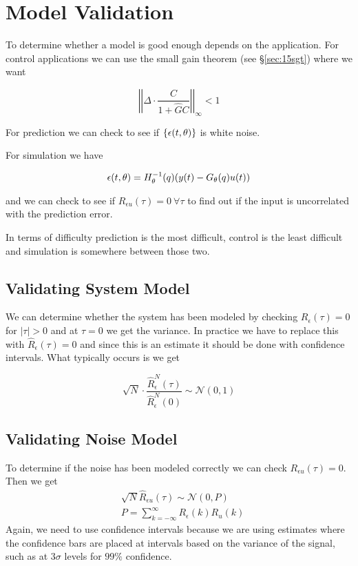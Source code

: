 \section{Model Validation}
To determine whether a model is good enough depends on the application.
For control applications we can use the small gain theorem (see \S\ref{sec:15sgt}) where we want

\begin{equation*}
\left|\left|\Delta\cdot\frac{C}{1+\hat{G}C}\right|\right|_\infty < 1
\end{equation*}

For prediction we can check to see if $\{\epsilon(t,\theta)\}$ is white noise.

For simulation we have

\begin{equation*}
\epsilon(t,\theta) = H_\theta^{-1}(q)(y(t)-G_\theta(q)u(t))
\end{equation*}

and we can check to see if $R_{\epsilon u}(\tau)=0~\forall \tau$ to find out if the input is uncorrelated with the prediction error.

In terms of difficulty prediction is the most difficult, control is the least difficult and simulation is somewhere between those two.

\subsection{Validating System Model}
We can determine whether the system has been modeled by checking $R_\epsilon(\tau)=0$ for $|\tau|>0$ and at $\tau=0$ we get the variance.
In practice we have to replace this with $\hat{R}_\epsilon(\tau)=0$ and since this is an estimate it should be done with confidence intervals.
What typically occurs is we get

\begin{equation*}
\sqrt{N}\cdot\frac{\hat{R}_\epsilon^N(\tau)}{\hat{R}_\epsilon^N(0)} \sim \mathcal{N}(0,1)
\end{equation*}

\subsection{Validating Noise Model}
To determine if the noise has been modeled correctly we can check $R_{\epsilon u}(\tau)=0$.
Then we get
\begin{align*}
&\sqrt{N}\hat{R}_{\epsilon u}(\tau) \sim \mathcal{N}(0,P) \\
&P = \sum_{k=-\infty}^\infty R_\epsilon(k)R_u(k)
\end{align*}
Again, we need to use confidence intervals because we are using estimates where the confidence bars are placed at intervals based on the variance of the signal, such as at $3\sigma$ levels for $99\%$ confidence.
